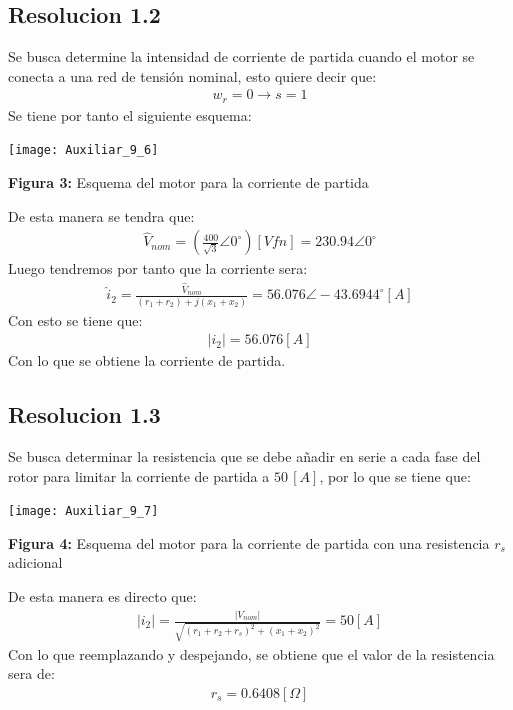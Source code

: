\documentclass[
  11pt,
  letterpaper,
   addpoints,
   answers
  ]{exam}
\begin{document}
\begin{questions}
\begin{solution}
        \subsection*{Resolucion 1.2}
        Se busca determine la intensidad de corriente de partida cuando el motor se conecta a una red de tensión nominal, esto quiere decir que:
        \begin{align}
            w_{r} = 0 \rightarrow s = 1 
        \end{align}
        Se tiene por tanto el siguiente esquema:
        \begin{center}
            \texttt{[image: Auxiliar\_9\_6]}
        \end{center}
        \begin{center}
            \textbf{Figura 3:} Esquema del motor para la corriente de partida
        \end{center}
        De esta manera se tendra que:
        \begin{align}
            \hat{V}_{nom} = \left(\frac{400}{\sqrt{3}}\angle 0^{\circ}\right)[Vfn]= 230.94 \angle 0^{\circ}
        \end{align}
        Luego tendremos por tanto que la corriente sera:
        \begin{align}
            \hat{i}_{2} = \frac{\hat{V}_{nom}}{(r_{1} + r_{2}) + j(x_{1} + x_{2})} = 56.076 \angle -43.6944^{\circ}[A]
        \end{align}
        Con esto se tiene que:
        \begin{align}
            |i_{2}| = 56.076[A]
        \end{align}
        Con lo que se obtiene la corriente de partida.
        \subsection*{Resolucion 1.3}
        Se busca determinar la resistencia que se debe añadir en serie a cada fase del rotor para limitar la corriente de partida a \(50 \, [A]\), por lo que se tiene que:
        \begin{center}
            \texttt{[image: Auxiliar\_9\_7]}
        \end{center}
        \begin{center}
            \textbf{Figura 4:} Esquema del motor para la corriente de partida con una resistencia $r_{s}$ adicional
        \end{center}
        De esta manera es directo que:
        \begin{align}
            |i_{2}| = \frac{|V_{nom}|}{\sqrt{(r_{1} + r_{2} + r_{s})^{2} + (x_{1} + x_{2})^{2}}} = 50[A]
        \end{align}
        Con lo que reemplazando y despejando, se obtiene que el valor de la resistencia sera de:
        \begin{align}
            r_{s} = 0.6408[\Omega]
        \end{align}

\end{solution}
\end{questions}
\end{document}
